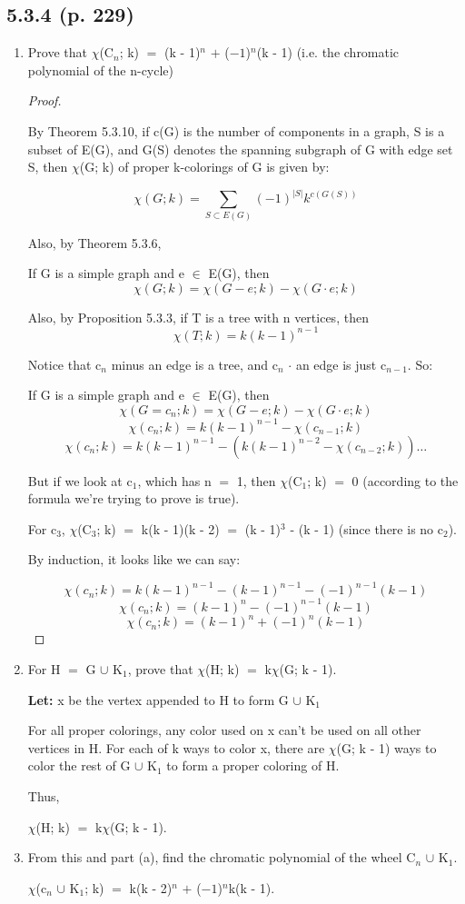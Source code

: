\documentclass{article}
\newcommand{\mt}[1]{\ensuremath{#1}}
\newcommand\ssc[2][\DefaultOpt]{%
  \def\DefaultOpt{#2}%
  \subsection[#1]{#2}%
}
\newcommand{\bgpf}{\begin{proof} $ $\newline}
\newcommand{\balist}{\begin{enumerate}[label=\alph*.]}
\newcommand{\elist}{\end{enumerate}}
\newcommand{\lt}[1]{\textbf{Let: } #1}
\newcommand{\epf}{\end{proof}}
\newcommand{\mem}{\mt{\in} }
\newcommand{\sbs}{\mt{\subset} }         %
\newcommand{\ps}{\mt{\operatorname{+}} }
\newcommand{\ms}{\mt{\operatorname{-}} }
\newcommand{\eql}{ \mt{\operatorname{=}} }
\newcommand{\uw}[2]{#1\mt{_{#2}}}
\newcommand{\eqn}[1]{\[#1\]}
\newcommand{\unn}{\mt{\cup} }
\begin{document}
\newpage

\ssc{5.3.4 (p. 229)}{

\balist
\item Prove that $\chi$(\uw{C}{n}; k) \eql (k \ms 1)$^n$ \ps ($-1$)$^n$(k \ms 1) (i.e. the chromatic polynomial of the n-cycle)

\bgpf

By Theorem 5.3.10, if c(G) is the number of components in a graph, S is a subset of E(G), and G(S) denotes the spanning subgraph of G with edge set S, then $\chi$(G; k) of proper k-colorings of G is given by:

\eqn{\chi(G; k) = \sum_{S \sbs E(G)} (-1)^{|S|}k^{c(G(S))}}

Also, by Theorem 5.3.6,

If G is a simple graph and e \mem E(G), then
\eqn{\chi(G; k) = \chi(G - e; k) - \chi(G \cdot e; k)}

Also, by Proposition 5.3.3, if T is a tree with n vertices, then
\eqn{\chi(T; k) = k(k - 1)^{n - 1}}

Notice that \uw{c}{n} minus an edge is a tree, and \uw{c}{n} $\cdot$ an edge is just \uw{c}{n - 1}. So:

If G is a simple graph and e \mem E(G), then
\eqn{\chi(G = c_n; k) = \chi(G - e; k) - \chi(G \cdot e; k)}
\eqn{\chi(c_n; k) = k(k - 1)^{n - 1} - \chi(c_{n - 1}; k)}
\eqn{\chi(c_n; k) = k(k - 1)^{n - 1} - (k(k - 1)^{n - 2} - \chi(c_{n - 2}; k))\dots}

But if we look at \uw{c}{1}, which has n \eql 1, then $\chi$(\uw{C}{1}; k) \eql 0 (according to the formula we're trying to prove is true).

For \uw{c}{3}, $\chi$(\uw{C}{3}; k) \eql k(k \ms 1)(k \ms 2) \eql (k \ms 1)$^3$ \ms (k \ms 1) (since there is no \uw{c}{2}).

By induction, it looks like we can say:

\eqn{\chi(c_n; k) = k(k - 1)^{n - 1} - (k - 1)^{n - 1} - (-1)^{n - 1}(k - 1)}
\eqn{\chi(c_n; k) = (k - 1)^n - (-1)^{n-1}(k - 1)}
\eqn{\chi(c_n; k) = (k - 1)^n + (-1)^n(k - 1)}

\epf

\item For H \eql G \unn \uw{K}{1}, prove that $\chi$(H; k) \eql k$\chi$(G; k \ms 1).

\lt{x be the vertex appended to H to form G \unn \uw{K}{1}}

For all proper colorings, any color used on x can't be used on all other vertices in H. For each of k ways to color x, there are $\chi$(G; k \ms 1) ways to color the rest of G \unn \uw{K}{1} to form a proper coloring of H.

Thus,

$\chi$(H; k) \eql k$\chi$(G; k \ms 1).

\item From this and part (a), find the chromatic polynomial of the wheel \uw{C}{n} \unn \uw{K}{1}.

$\chi$(\uw{c}{n} \unn \uw{K}{1}; k) \eql k(k \ms 2)$^n$ \ps ($-1$)$^n$k(k \ms 1).
\elist

}
\end{document}
